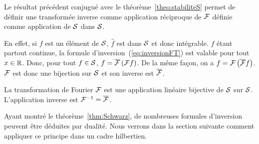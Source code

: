 Le r{\'e}sultat pr{\'e}c{\'e}dent conjugu{\'e} avec le th{\'e}or{\`e}me~\ref{theo:stabiliteS} permet de
d{\'e}finir une transform{\'e}e inverse comme application r{\'e}ciproque de $\mathcal{F}$ d{\'e}finie
comme application de $\mathcal{S}$ dans $\mathcal{S}$.

En effet, si $f$ est un {\'e}l{\'e}ment de $\mathcal{S}$, $\hat{f}$ est dans $\mathcal{S}$ et donc
int{\'e}grable. $f$ {\'e}tant partout continue, la formule
d'inversion~(\ref{eq:inversionFT}) est valable pour tout $x \in \mathbb{R}$. Donc,
pour tout $f \in \mathcal{S}$, $f = \overline{\mathcal{F}}\left( \mathcal{F} f \right)$. De la m{\^e}me fa\c{c}on, on a $f =
\mathcal{F}\left( \overline{\mathcal{F}} f \right)$. $\mathcal{F}$ est donc une bijection sur $\mathcal{S}$ et son inverse est
$\overline{\mathcal{F}}$.

\begin{theorem}\label{thm:Schwarz}
La transformation de Fourier $\mathcal{F}$ est une application lin{\'e}aire bijective de $\mathcal{S}$ sur $\mathcal{S}$.
L'application inverse est $\mathcal{F}^{-1} = \overline{\mathcal{F}}$.
\end{theorem}

Ayant montr{\'e} le th{\'e}or{\`e}me~\ref{thm:Schwarz}, de nombreuses formules d'inversion peuvent \^etre d{\'e}duites par dualit{\'e}.
Nous verrons dans la section suivante comment appliquer ce principe dans un cadre hilbertien.



